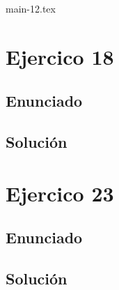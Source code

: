 \documentclass[a4paper,12pt]{article}
\begin{document}
\tableofcontents

{main-12.tex}



\newpage
\section{Ejercico 18}
\subsection{Enunciado}
\subsection{Solución}

\newpage
\section{Ejercico 23}
\subsection{Enunciado}
\subsection{Solución}
\end{document}
